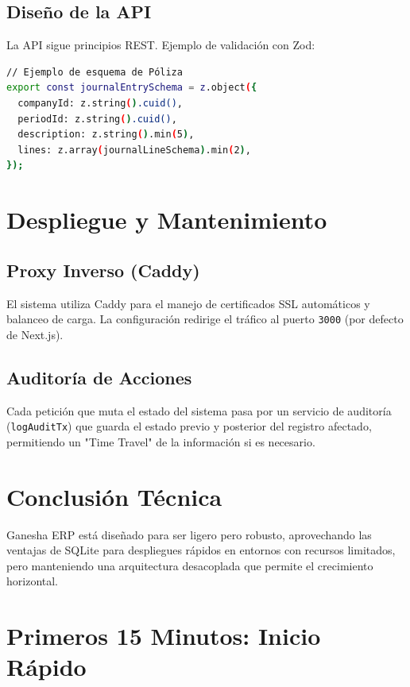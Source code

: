 \documentclass[12pt, a4paper, oneside]{book}
\begin{document}
\section{Diseño de la API}
La API sigue principios REST. Ejemplo de validación con Zod:
\begin{lstlisting}[language=bash]
// Ejemplo de esquema de Póliza
export const journalEntrySchema = z.object({
  companyId: z.string().cuid(),
  periodId: z.string().cuid(),
  description: z.string().min(5),
  lines: z.array(journalLineSchema).min(2),
});
\end{lstlisting}

\chapter{Despliegue y Mantenimiento}

\section{Proxy Inverso (Caddy)}
El sistema utiliza Caddy para el manejo de certificados SSL automáticos y balanceo de carga. La configuración redirige el tráfico al puerto \texttt{3000} (por defecto de Next.js).

\section{Auditoría de Acciones}
Cada petición que muta el estado del sistema pasa por un servicio de auditoría (\texttt{logAuditTx}) que guarda el estado previo y posterior del registro afectado, permitiendo un "Time Travel" de la información si es necesario.

\chapter{Conclusión Técnica}
Ganesha ERP está diseñado para ser ligero pero robusto, aprovechando las ventajas de SQLite para despliegues rápidos en entornos con recursos limitados, pero manteniendo una arquitectura desacoplada que permite el crecimiento horizontal.





\chapter{Primeros 15 Minutos: Inicio Rápido}
\end{document}
